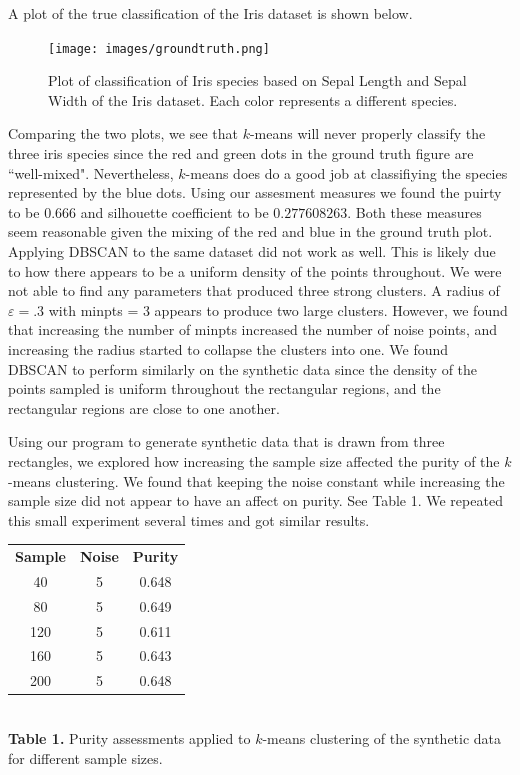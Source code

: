 \documentclass[psamsfonts,onesided,10pt]{amsart}
\begin{document}
A plot of the true classification of the Iris dataset is shown below.
\begin{figure}[H]
    \centering
    {\texttt{[image: images/groundtruth.png]}} \\
    \caption{Plot of classification of Iris species based on Sepal Length and Sepal Width of the Iris dataset. Each color represents a different species.}
\end{figure}

Comparing the two plots, we see that $k$-means will never properly classify the three iris species 
since the red and green dots in the ground truth figure are ``well-mixed". Nevertheless, $k$-means 
does do a good job at classifiying the species represented by the blue dots. Using our assesment 
measures we found the puirty to be $0.666$ and silhouette coefficient to be $0.277608263$. 
Both these measures seem reasonable given the mixing of the red and blue in the ground truth plot.
Applying DBSCAN to the same dataset did not work as well. This is likely due to how there appears
 to be a uniform density of the points throughout. We were not able to find any parameters that 
produced three strong clusters. A radius of $\varepsilon = .3$  with minpts = 3 appears to 
produce two large clusters. However, we found that increasing the number of minpts increased 
the number of noise points, and increasing the radius started to collapse the clusters into one. 
We found DBSCAN to perform similarly on the synthetic data since the density of the 
points sampled is uniform throughout the rectangular regions, and the rectangular regions are 
close to one another.

Using our program to generate synthetic data that is drawn from three rectangles, we explored 
how increasing the sample size affected the purity of the $k$-means clustering. We found that 
keeping the noise constant while increasing the sample size did not appear to have an affect on 
purity. See Table 1. We repeated this small experiment several times and got similar results. 

\vspace{1ex}
\begin{center}
\begin{tabular}{ |c|c|c| } 
 \hline
\textbf{Sample} & \textbf{Noise} & \textbf{Purity}\\ 
40 & 5 & 0.648 \\ 
80 & 5 & 0.649 \\ 
120 & 5 & 0.611 \\ 
160 & 5 & 0.643 \\ 
200 & 5 & 0.648 \\ 
 \hline
\end{tabular}\\
\textbf{Table 1.} Purity assessments applied to $k$-means clustering of the synthetic data for 
different sample sizes.
\end{center}
\vspace{1ex}
\end{document}
